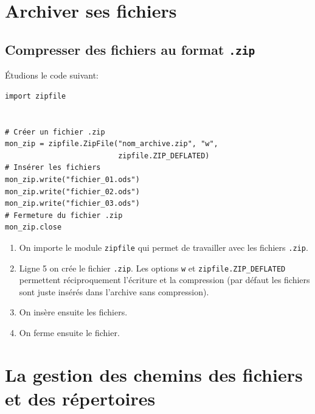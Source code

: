 \documentclass[a4paper,12pt]{book}
\begin{document}
\chapter{Archiver ses fichiers}
\section{Compresser des fichiers au format \texttt{.zip}}
Étudions le code suivant:
\begin{lstlisting}
import zipfile


# Créer un fichier .zip
mon_zip = zipfile.ZipFile("nom_archive.zip", "w", 
                          zipfile.ZIP_DEFLATED)  
# Insérer les fichiers
mon_zip.write("fichier_01.ods")
mon_zip.write("fichier_02.ods")
mon_zip.write("fichier_03.ods")
# Fermeture du fichier .zip
mon_zip.close
\end{lstlisting}
\medskip
                                                                                                                                                              
\begin{enumerate}
	\item On importe le module \texttt{zipfile} qui permet de travailler avec les fichiers \texttt{.zip}.
	\item Ligne 5 on crée le fichier \texttt{.zip}. Les options \texttt{w} et \texttt{zipfile.ZIP\_DEFLATED} permettent réciproquement l'écriture et la compression (par défaut les fichiers sont juste insérés dans l'archive sans compression).
	\item On insère ensuite les fichiers.
	\item On ferme ensuite le fichier.
\end{enumerate}                                                                                                                                                         
\medskip

\chapter{La gestion des chemins des fichiers et des répertoires}
\end{document}
